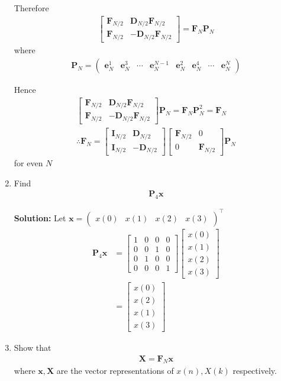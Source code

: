 \documentclass[journal,12pt,twocolumn]{IEEEtran}
\newcommand{\solution}{\noindent \textbf{Solution: }}
\let\vec\mathbf
\numberwithin{equation}{section}
\renewcommand\thesection{\arabic{section}}
\newcommand{\myvec}[1]{\ensuremath{\begin{pmatrix}#1\end{pmatrix}}}
\newcommand{\mymat}[1]{\ensuremath{\begin{bmatrix}#1\end{bmatrix}}}
\begin{document}
\begin{enumerate}[label=\thesection.\arabic*]
	Therefore
	\begin{align}
		\mymat{\vec{F}_{N/2} & \vec{D}_{N/2}\vec{F}_{N/2} \\ \vec{F}_{N/2} & -\vec{D}_{N/2}\vec{F}_{N/2}} = \vec{F}_N \vec{P}_N
	\end{align}
	where 
	\begin{align}
		\vec{P}_N = \myvec{\vec{e}_N^1 & \vec{e}_N^3 & \cdots & \vec{e}_N^{N-1} & \vec{e}_N^2 & \vec{e}_N^4 & \cdots & \vec{e}_N^N}
	\end{align}
	
	Hence
	\begin{align}
		\mymat{\vec{F}_{N/2} & \vec{D}_{N/2}\vec{F}_{N/2} \\ \vec{F}_{N/2} & -\vec{D}_{N/2}\vec{F}_{N/2}} \vec{P}_N = \vec{F}_N \vec{P}_N^2 = \vec{F}_N \\
		\therefore \vec{F}_N = \mymat{\vec{I}_{N/2} & \vec{D}_{N/2} \\ \vec{I}_{N/2} & -\vec{D}_{N/2}} \mymat{\vec{F}_{N/2} & 0 \\ 0 & \vec{F}_{N/2}} \vec{P}_N
	\end{align}
	for even $N$

\item Find 
    \begin{align}
	     \vec{P}_4 \vec{x}
    \end{align}
    
    \solution Let $\vec{x} = \myvec{x(0) & x(1) & x(2) & x(3)}^\top$
    \begin{align}
		\vec{P}_4 \vec{x} &= \mymat{1 & 0 & 0 & 0 \\ 0 & 0 & 1 & 0 \\ 0 & 1 & 0 & 0 \\ 0 & 0 & 0 & 1} \mymat{x(0) \\ x(1) \\ x(2) \\ x(3)} \\
		&= \mymat{x(0) \\ x(2) \\ x(1) \\ x(3)}
    \end{align}

\item Show that 
    \begin{align}
	    \vec{X} = \vec{F}_N \vec{x}
	    \label{eq:dft-mat-def}
    \end{align}
		where $\vec{x}, \vec{X}$ are the vector representations of $x(n), X(k)$ respectively.
		

\end{enumerate}
\end{document}
